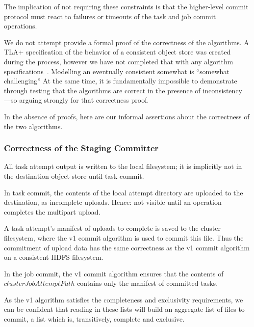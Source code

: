 \documentclass[format=acmsmall, screen=true, nonacm, timestamp, review=false]{acmart}
\begin{document}
The implication of not requiring these constraints is that the higher-level
commit protocol must react to failures or timeouts of the task and job
commit operations.



We do not attempt provide a formal proof of the correctness of the algorithms.
A TLA+ specification of the behavior of a consistent object store was created
during the process, however we have not completed that with any
algorithm specifications\ \cite{s3-tla}.
Modelling an eventually consistent somewhat is ``somewhat challenging''
At the same time, it is fundamentally impossible to demonstrate through testing
that the algorithms are correct in the presence of inconsistency ---so arguing
strongly for that correctness proof.

In the absence of proofs,
here are our informal assertions about the correctness of the two algorithms.

\subsubsection{Correctness of the Staging Committer}

All task attempt output is written to the local filesystem;
it is implicitly not in the destination object store until task commit.

In task commit, the contents of the local attempt directory are uploaded to the
destination, as incomplete uploads.
Hence: not visible until an operation completes the multipart upload.

A task attempt's manifest of uploads to complete is saved to the cluster filesystem,
where the v1 commit algorithm is used to commit this file.
Thus the commitment of upload data has the same correctness as the
v1 commit algorithm on a consistent HDFS filesystem.

In the job commit, the v1 commit algorithm ensures that the contents
of $clusterJobAttemptPath$ contains only the manifest of committed tasks.

As the v1 algorithm satisfies the completeness and exclusivity requirements,
we can be confident that reading in these lists will build an aggregate list
of files to commit, a list which is, transitively, complete and exclusive.
\end{document}
